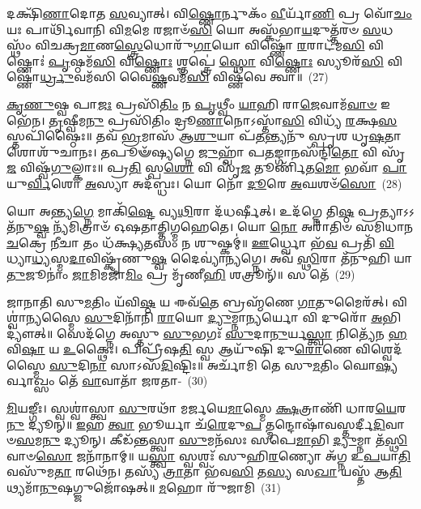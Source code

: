 𑌦𑌕𑍍𑌷𑌿᳴\-\ul{𑌣𑌾}\-𑌦𑍋𑌤 \ul{𑌸}\-𑌵𑍍𑌯𑌾𑌤𑍍। 𑌵𑌿\-\ul{𑌷𑍍𑌣𑍋}\-𑌰𑍍𑌨𑍁𑌕𑌂᳴ \ul{𑌵𑍀}\-𑌰𑍍𑌯𑌾᳴\-\ul{𑌣𑌿} 𑌪𑍍𑌰 𑌵𑍋᳴\-\ul{𑌚𑌂} 𑌯𑌃 𑌪𑌾𑌰𑍍𑌥𑌿᳴𑌵𑌾𑌨𑌿 𑌵𑌿\-\ul{𑌮}\-𑌮𑍇 𑌰𑌜𑌾𑍞᳴\-\ul{𑌸𑌿} 𑌯𑍋 𑌅𑌸𑍍𑌕᳴𑌭𑌾\-\ul{𑌯}\-𑌦𑍁𑌤𑍍𑌤᳴𑌰𑍞 \ul{𑌸}\-𑌧𑌸𑍍𑌥𑌂᳴ 𑌵𑌿𑌚𑌕𑍍𑌰\-\ul{𑌮𑌾}\-𑌣\-\ul{𑌸𑍍𑌤𑍍𑌰𑍇}\-𑌧𑍋𑌰𑍁᳴\-\ul{𑌗𑌾}\-𑌯𑍋 𑌵𑌿𑌷𑍍𑌣𑍋᳴ \ul{𑌰}\-𑌰𑌾𑌟᳴𑌮\-\ul{𑌸𑌿} 𑌵𑌿𑌷𑍍𑌣𑍋𑌃॑ \ul{𑌪𑍃}\-𑌷𑍍𑌠𑌮᳴\-\ul{𑌸𑌿} 𑌵𑌿\-\ul{𑌷𑍍𑌣𑍋𑌃} 𑌶𑍍𑌞𑌪𑍍𑌤𑍍𑌰𑍇॑ \ul{𑌸𑍍𑌥𑍋} 𑌵𑌿\-\ul{𑌷𑍍𑌣𑍋𑌃} 𑌸𑍍𑌯𑍂𑌰᳴\-\ul{𑌸𑌿} 𑌵𑌿𑌷𑍍𑌣𑍋॑\-\ul{𑌰𑍍𑌧𑍍𑌰𑍁}\-𑌵𑌮᳴𑌸𑌿 𑌵𑍈\-\ul{𑌷𑍍𑌣}\-𑌵𑌮᳴\-\ul{𑌸𑌿} 𑌵𑌿𑌷𑍍𑌣᳴𑌵𑍇 𑌤𑍍𑌵𑌾॥~(27)

{\anuvakamend[{\-\ul{𑌅}\-\-\ul{𑌸𑍍𑌯} \ul{𑌯}\-𑌚𑍍𑌛𑍈\-\ul{𑌕𑌾}\-𑌨𑍍𑌨𑌚᳴𑌤𑍍𑌵𑌾\-\ul{𑌰𑌿}\-\-\ul{𑍞}\-𑌶𑌚𑍍𑌚᳴}]}%

\-\ul{𑌕𑍃}\-\-\ul{𑌣𑍁}\-𑌷𑍍𑌵 𑌪𑌾\-\ul{𑌜𑌃} 𑌪𑍍𑌰𑌸𑌿᳴\-\ul{𑌤𑌿𑌂} 𑌨 \ul{𑌪𑍃}\-𑌥𑍍𑌵𑍀𑌂 \ul{𑌯𑌾}\-𑌹𑌿 𑌰𑌾\-\ul{𑌜𑍇}\-𑌵𑌾𑌮᳴\-\ul{𑌵𑌾}\-\-\ul{𑍞} 𑌇𑌭𑍇᳴𑌨। \ul{𑌤𑍃}\-𑌷𑍍𑌵𑍀𑌮\-\ul{𑌨𑍁} 𑌪𑍍𑌰𑌸𑌿᳴𑌤𑌿𑌂 𑌦𑍍𑌰𑍂\-\ul{𑌣𑌾}\-𑌨𑍋\-𑌽𑌸𑍍𑌤𑌾᳴\-\ul{𑌸𑌿} 𑌵𑌿𑌧𑍍𑌯᳴ \ul{𑌰}\-𑌕𑍍𑌷\-\ul{𑌸}\-𑌸𑍍𑌤𑌪𑌿᳴𑌷𑍍𑌠𑍈𑌃॥ 𑌤𑌵᳴ \ul{𑌭𑍍𑌰}\-𑌮𑌾𑌸᳴ 𑌆\-\ul{𑌶𑍁}\-𑌯𑌾 𑌪᳴\-\ul{𑌤}\-𑌨𑍍𑌤𑍍𑌯𑌨𑍁᳴ 𑌸𑍍𑌪𑍃𑌶 𑌧𑍃\-\ul{𑌷}\-𑌤𑌾 𑌶𑍋𑌶𑍁᳴𑌚𑌾𑌨𑌃। 𑌤𑌪𑍂𑍟᳴𑌷𑍍𑌯𑌗𑍍𑌨𑍇 \ul{𑌜𑍁}\-𑌹𑍍𑌵𑌾᳴ 𑌪\-\ul{𑌤}\-𑌙𑍍𑌗𑌾𑌨𑌸᳴𑌨𑍍𑌦𑌿\-\ul{𑌤𑍋} 𑌵𑌿 𑌸𑍃᳴\-\ul{𑌜} 𑌵𑌿𑌷𑍍𑌵᳴\-\ul{𑌗𑍁}\-𑌲𑍍𑌕𑌾𑌃॥ 𑌪𑍍𑌰\-\ul{𑌤𑌿} 𑌸𑍍𑌪\-\ul{𑌶𑍋} 𑌵𑌿 𑌸𑍃᳴\-\ul{𑌜} 𑌤𑍂𑌰𑍍𑌣𑌿᳴𑌤\-\ul{𑌮𑍋} 𑌭𑌵𑌾᳴ \ul{𑌪𑌾}\-𑌯𑍁\-\ul{𑌰𑍍𑌵𑌿}\-𑌶𑍋 \ul{𑌅}\-𑌸𑍍𑌯𑌾 𑌅𑌦᳴𑌬𑍍𑌧𑌃। 𑌯𑍋 𑌨𑍋᳴ \ul{𑌦𑍂}\-𑌰𑍇 \ul{𑌅}\-𑌘𑌶𑍞᳴\-\ul{𑌸𑍋}\-~(28)

𑌯𑍋 𑌅𑌨𑍍𑌤𑍍𑌯\-\ul{𑌗𑍍𑌨𑍇} 𑌮𑌾𑌕𑌿᳴\-\ul{𑌷𑍍𑌟𑍇} 𑌵𑍍𑌯\-\ul{𑌥𑌿}\-𑌰𑌾 𑌦᳴𑌧𑌰𑍍𑌷𑍀𑌤𑍍। 𑌉𑌦᳴𑌗𑍍𑌨𑍇 𑌤𑌿\-\ul{𑌷𑍍𑌠} 𑌪𑍍𑌰𑌤𑍍𑌯𑌾\-𑌽\-𑌽𑌤᳴𑌨𑍁\-\ul{𑌷𑍍𑌵} 𑌨𑍍𑌯᳴𑌮𑌿𑌤𑍍𑌰𑌾𑍞᳴ 𑌓𑌷𑌤𑌾𑌤𑍍𑌤𑌿𑌗𑍍𑌮𑌹𑍇𑌤𑍇। 𑌯𑍋 \ul{𑌨𑍋} 𑌅𑌰𑌾᳴𑌤𑌿𑍞 𑌸𑌮𑌿𑌧𑌾𑌨 \ul{𑌚}\-𑌕𑍍𑌰𑍇 \ul{𑌨𑍀}\-𑌚𑌾 𑌤𑌂 𑌧᳴𑌕𑍍𑌷𑍍𑌯\-\ul{𑌤}\-𑌸𑌂 𑌨 𑌶𑍁𑌷𑍍𑌕𑌮𑍍॑॥ \ul{𑌊}\-𑌰𑍍𑌧𑍍𑌵𑍋 𑌭᳴\-\ul{𑌵} 𑌪𑍍𑌰𑌤𑌿᳴ \ul{𑌵𑌿}\-𑌧𑍍𑌯𑌾\-\ul{𑌧𑍍𑌯}\-𑌸𑍍𑌮\-\ul{𑌦𑌾}\-𑌵𑌿𑌷𑍍𑌕𑍃᳴𑌣𑍁\-\ul{𑌷𑍍𑌵} 𑌦𑍈𑌵𑍍𑌯𑌾॑𑌨𑍍𑌯𑌗𑍍𑌨𑍇। 𑌅𑌵᳴ \ul{𑌸𑍍𑌥𑌿}\-𑌰𑌾 𑌤᳴𑌨𑍁𑌹𑌿 𑌯𑌾\-\ul{𑌤𑍁}\-𑌜𑍂𑌨𑌾𑌂॑ \ul{𑌜𑌾}\-𑌮𑌿𑌮𑌜𑌾᳴\-\ul{𑌮𑌿𑌂} 𑌪𑍍𑌰 𑌮𑍃᳴𑌣𑍀\-\ul{𑌹𑌿} 𑌶𑌤𑍍𑌰𑍂𑌨𑍍᳴॥ 𑌸 𑌤𑍇᳴~(29)

𑌜𑌾𑌨𑌾𑌤𑌿 𑌸𑍁\-\ul{𑌮}\-𑌤𑌿𑌂 𑌯᳴𑌵𑌿\-\ul{𑌷𑍍𑌠} 𑌯 𑌈𑌵᳴\-\ul{𑌤𑍇} 𑌬𑍍𑌰𑌹𑍍𑌮᳴𑌣𑍇 \ul{𑌗𑌾}\-𑌤𑍁𑌮𑍈𑌰᳴𑌤𑍍। 𑌵𑌿𑌶𑍍𑌵𑌾॑𑌨𑍍𑌯𑌸𑍍𑌮𑍈 \ul{𑌸𑍁}\-𑌦𑌿𑌨𑌾᳴𑌨𑌿 \ul{𑌰𑌾}\-𑌯𑍋 \ul{𑌦𑍍𑌯𑍁}\-𑌮𑍍𑌨𑌾\-\ul{𑌨𑍍𑌯}\-𑌰𑍍𑌯𑍋 𑌵𑌿 𑌦𑍁𑌰𑍋᳴ \ul{𑌅}\-𑌭𑌿 𑌦𑍍𑌯𑍗॑𑌤𑍍॥ 𑌸𑍇𑌦᳴𑌗𑍍𑌨𑍇 𑌅𑌸𑍍𑌤𑍁 \ul{𑌸𑍁}\-𑌭𑌗𑌃᳴ \ul{𑌸𑍁}\-𑌦𑌾\-\ul{𑌨𑍁}\-𑌰𑍍𑌯\-\ul{𑌸𑍍𑌤𑍍𑌵𑌾} 𑌨𑌿𑌤𑍍𑌯𑍇᳴𑌨 \ul{𑌹}\-𑌵𑌿\-\ul{𑌷𑌾} 𑌯 \ul{𑌉}\-𑌕𑍍𑌥𑍈𑌃। 𑌪𑌿𑌪𑍍𑌰𑍀᳴𑌷\-\ul{𑌤𑌿} 𑌸𑍍𑌵 𑌆𑌯𑍁᳴𑌷𑌿 𑌦𑍁\-\ul{𑌰𑍋}\-𑌣𑍇 𑌵𑌿𑌶𑍍𑌵𑍇𑌦᳴𑌸𑍍𑌮𑍈 \ul{𑌸𑍁}\-𑌦𑌿\-\ul{𑌨𑌾} 𑌸𑌾\-𑌽𑌸᳴\-\ul{𑌦𑌿}\-𑌷𑍍𑌟𑌿𑌃॥ 𑌅𑌰𑍍𑌚𑌾᳴𑌮𑌿 𑌤𑍇 𑌸𑍁\-\ul{𑌮}\-𑌤𑌿𑌂 𑌘𑍋\-\ul{𑌷𑍍𑌯}\-𑌰𑍍𑌵𑌾𑌖𑍍𑌸𑌂 𑌤𑍇᳴ \ul{𑌵𑌾}\-𑌵𑌾𑌤𑌾᳴ 𑌜𑌰𑌤𑌾-~(30)

\-\ul{𑌮𑌿}\-𑌯𑌙𑍍𑌗𑍀𑌃। 𑌸𑍍𑌵𑌶𑍍𑌵𑌾॑𑌸𑍍𑌤𑍍𑌵𑌾 \ul{𑌸𑍁}\-𑌰𑌥𑌾᳴ 𑌮𑌰𑍍𑌜𑌯𑍇\-\ul{𑌮𑌾}\-𑌸𑍍𑌮𑍇 \ul{𑌕𑍍𑌷}\-𑌤𑍍𑌰𑌾𑌣𑌿᳴ 𑌧𑌾𑌰\-\ul{𑌯𑍇}\-𑌰\-\ul{𑌨𑍁} 𑌦𑍍𑌯𑍂𑌨𑍍॥ \ul{𑌇}\-𑌹 \ul{𑌤𑍍𑌵𑌾} 𑌭𑍂𑌰𑍍𑌯𑌾 𑌚᳴\-\ul{𑌰𑍇}\-𑌦𑍁\-\ul{𑌪} 𑌤𑍍𑌮𑌨𑍍𑌦𑍋𑌷𑌾᳴𑌵𑌸𑍍𑌤𑌰𑍍𑌦𑍀\-\ul{𑌦𑌿}\-𑌵𑌾𑍞\-\-\ul{𑌸}\-𑌮\-\ul{𑌨𑍁} 𑌦𑍍𑌯𑍂𑌨𑍍। 𑌕𑍀𑌡᳴𑌨𑍍𑌤𑌸𑍍𑌤𑍍𑌵𑌾 \ul{𑌸𑍁}\-𑌮𑌨᳴𑌸𑌃 𑌸𑌪𑍇\-\ul{𑌮𑌾}\-𑌭𑌿 \ul{𑌦𑍍𑌯𑍁}\-𑌮𑍍𑌨𑌾 𑌤᳴\-\ul{𑌸𑍍𑌥𑌿}\-𑌵𑌾𑍞\-\ul{𑌸𑍋} 𑌜𑌨𑌾᳴𑌨𑌾𑌮𑍍॥ 𑌯\-\ul{𑌸𑍍𑌤𑍍𑌵𑌾} 𑌸𑍍𑌵𑌶𑍍𑌵𑌃᳴ 𑌸𑍁𑌹𑌿\-\ul{𑌰}\-𑌣𑍍𑌯𑍋 𑌅᳴𑌗𑍍𑌨 𑌉\-\ul{𑌪}\-𑌯𑌾\-\ul{𑌤𑌿} 𑌵𑌸𑍁᳴𑌮\-\ul{𑌤𑌾} 𑌰𑌥𑍇᳴𑌨। 𑌤𑌸𑍍𑌯᳴ \ul{𑌤𑍍𑌰𑌾}\-𑌤𑌾 𑌭᳴𑌵\-\ul{𑌸𑌿} 𑌤\-\ul{𑌸𑍍𑌯} 𑌸\-\ul{𑌖𑌾} 𑌯𑌸𑍍𑌤᳴ 𑌆\-\ul{𑌤𑌿}\-𑌥𑍍𑌯𑌮𑌾᳴\-\ul{𑌨𑍁}\-𑌷𑌗𑍍𑌜𑍁𑌜𑍋᳴𑌷𑌤𑍍॥ \ul{𑌮}\-𑌹𑍋 𑌰𑍁᳴𑌜𑌾𑌮𑌿~(31)

